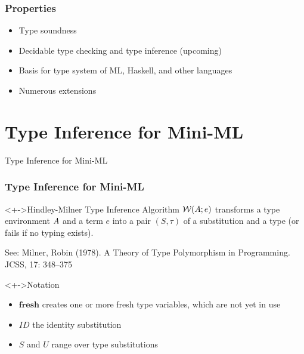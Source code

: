 \documentclass[pdftex,aspectratio=169]{beamer}
\begin{document}
\begin{frame}
  \frametitle{Properties}
  \begin{itemize}
  \item Type soundness
  \item Decidable type checking and type inference (upcoming)
  \item Basis for type system of ML, Haskell, and other languages
  \item Numerous extensions
  \end{itemize}
\end{frame}

\section{Type Inference for Mini-ML}
\begin{frame}
    \Huge
  \begin{center}
    {Type Inference for Mini-ML}
  \end{center}
\end{frame}

\begin{frame}
  \frametitle{Type Inference for Mini-ML}
  \begin{block}<+->{Hindley-Milner Type Inference Algorithm $\mathcal{W} (A; e)$}
    transforms a type environment
    $A$ and a  term $e$ into a pair $(S, \tau)$ of a
    substitution and a type (or fails if no typing exists).

    See: Milner, Robin (1978). A Theory of Type Polymorphism in Programming. JCSS, 17: 348–375
  \end{block}
  \begin{block}<+->{Notation}
    \begin{itemize}
    \item $\mathbf{fresh}$ creates one or more fresh type variables, which are not yet in use
    \item $\mathit{ID}$ the identity substitution
    \item $S$ and $U$ range over type substitutions
    \end{itemize}
  \end{block}
\end{frame}
\end{document}
